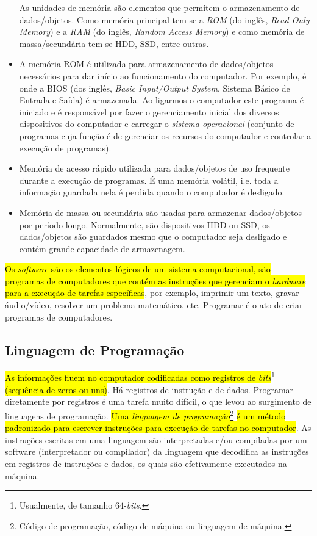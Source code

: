 \begin{itemize}
  As unidades de memória são elementos que permitem o armazenamento de dados/objetos. Como memória principal tem-se a \emph{ROM} (do inglês, \textit{Read Only Memory}) e a \emph{RAM} (do inglês, \textit{Random Access Memory}) e como memória de massa/secundária tem-se HDD, SSD, entre outras.

\item {}

  A memória ROM é utilizada para armazenamento de dados/objetos necessários para dar início ao funcionamento do computador. Por exemplo, é onde a BIOS (dos inglês, \textit{Basic Input/Output System}, Sistema Básico de Entrada e Saída) é armazenada. Ao ligarmos o computador este programa é iniciado e é responsável por fazer o gerenciamento inicial dos diversos dispositivos do computador e carregar o \emph{sistema operacional} (conjunto de programas cuja função é de gerenciar os recursos do computador e controlar a execução de programas).

\item {}

  Memória de acesso rápido utilizada para dados/objetos de uso frequente durante a execução de programas. É uma memória volátil, i.e. toda a informação guardada nela é perdida quando o computador é desligado.

\item {}

  Memória de massa ou secundária são usadas para armazenar dados/objetos por período longo. Normalmente, são dispositivos HDD ou SSD, os dados/objetos são guardados mesmo que o computador seja desligado e contém grande capacidade de armazenagem.   
\end{itemize}

\hl{Os \emph{software} são os elementos lógicos de um sistema computacional, são programas de computadores que contém as instruções que gerenciam o \emph{hardware} para a execução de tarefas específicas}, por exemplo, imprimir um texto, gravar áudio/vídeo, resolver um problema matemático, etc. Programar é o ato de criar programas de computadores.

\subsection{Linguagem de Programação}

\hl{As informações fluem no computador codificadas como registros de \textit{bits}}\footnote{Usualmente, de tamanho $64$-\textit{bits}.}\hl{ (sequência de zeros ou uns)}. Há registros de instrução e de dados. Programar diretamente por registros é uma tarefa muito difícil, o que levou ao surgimento de linguagens de programação. \hl{Uma \emph{linguagem de programação}}\footnote{Código de programação, código de máquina ou linguagem de máquina.}\hl{ é um método padronizado para escrever instruções para execução de tarefas no computador}. As instruções escritas em uma linguagem são interpretadas e/ou compiladas por um software (interpretador ou compilador) da linguagem que decodifica as instruções em registros de instruções e dados, os quais são efetivamente executados na máquina.

